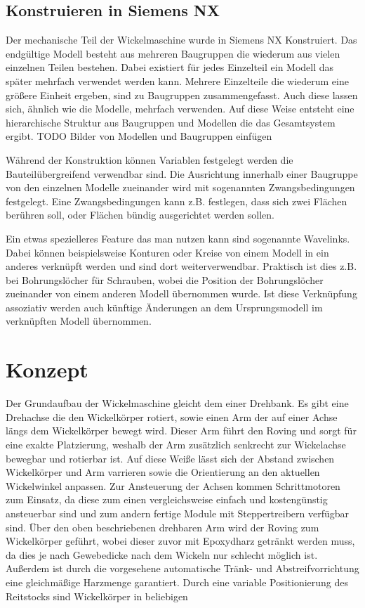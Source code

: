 \documentclass[12pt, a4paper, ngerman]{article}
\begin{document}
\subsection{Konstruieren in Siemens NX}
Der mechanische Teil der Wickelmaschine wurde in Siemens NX Konstruiert. Das endgültige Modell besteht aus mehreren Baugruppen die wiederum aus vielen einzelnen Teilen bestehen. Dabei existiert für jedes Einzelteil ein Modell das später mehrfach verwendet werden kann.  Mehrere Einzelteile die wiederum eine größere Einheit ergeben, sind zu Baugruppen zusammengefasst. Auch diese lassen sich, ähnlich wie die Modelle, mehrfach verwenden. Auf diese Weise entsteht eine hierarchische Struktur aus Baugruppen und Modellen die das Gesamtsystem ergibt. TODO Bilder von Modellen und Baugruppen einfügen

Während der Konstruktion können Variablen festgelegt werden die Bauteilübergreifend verwendbar sind. Die Ausrichtung innerhalb einer Baugruppe von den einzelnen Modelle zueinander wird mit sogenannten Zwangsbedingungen festgelegt. Eine Zwangsbedingungen kann z.B. festlegen, dass sich zwei Flächen berühren soll, oder Flächen bündig ausgerichtet werden sollen. 

Ein etwas spezielleres Feature das man nutzen kann sind sogenannte Wavelinks. Dabei können beispielsweise Konturen oder Kreise von einem Modell in ein anderes verknüpft werden und sind dort weiterverwendbar. Praktisch ist dies z.B. bei Bohrungslöcher für Schrauben, wobei die Position der Bohrungslöcher zueinander von einem anderen Modell übernommen wurde. Ist diese Verknüpfung assoziativ werden auch künftige Änderungen an dem Ursprungsmodell im verknüpften Modell übernommen.
    
\section{Konzept}
Der Grundaufbau der Wickelmaschine gleicht dem einer Drehbank. Es gibt eine Drehachse die den Wickelkörper rotiert, sowie einen Arm der auf einer Achse längs dem Wickelkörper bewegt wird. Dieser Arm führt den Roving und sorgt für eine exakte Platzierung, weshalb der Arm zusätzlich senkrecht zur Wickelachse bewegbar und rotierbar ist. Auf diese Weiße lässt sich der Abstand zwischen Wickelkörper und Arm varrieren sowie die Orientierung an den aktuellen Wickelwinkel anpassen. Zur Ansteuerung der Achsen kommen Schrittmotoren zum Einsatz, da diese zum einen vergleichsweise einfach und kostengünstig ansteuerbar sind und zum andern fertige Module mit Steppertreibern verfügbar sind. Über den oben beschriebenen drehbaren Arm wird der Roving zum Wickelkörper geführt, wobei dieser zuvor mit Epoxydharz getränkt werden muss, da dies je nach Gewebedicke nach dem Wickeln nur schlecht möglich ist. Außerdem ist durch die vorgesehene automatische Tränk- und Abstreifvorrichtung eine gleichmäßige Harzmenge garantiert. Durch eine variable Positionierung des Reitstocks sind Wickelkörper in beliebigen 
\end{document}
